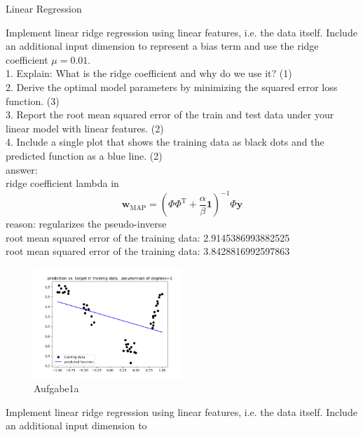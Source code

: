 \documentclass[
	ngerman,
     solution=true
	]{tudaexercise}
\begin{document}
\begin{task}{Linear Regression}
\begin{subtask}[1a)]
Implement linear ridge regression using linear features, i.e. the data itself. Include an additional input dimension to
represent a bias term and use the ridge coefficient $ \mu = 0.01$.\\[15pt]
1. Explain: What is the ridge coefficient and why do we use it? (1)\\[15pt]
2. Derive the optimal model parameters by minimizing the squared error loss function. (3)\\[15pt]
3. Report the root mean squared error of the train and test data under your linear model with linear features. (2)\\[15pt]
4. Include a single plot that shows the training data as black dots and the predicted function as a blue line. (2)
\\[15pt]
answer:\\[15pt]
ridge coefficient lambda in
\[
\mathbf{w}_{\mathrm{MAP}}=\left(\Phi \Phi^{\mathrm{T}}+\frac{\alpha}{\beta} \mathbf{1}\right)^{-1} \Phi \mathbf{y}
\]
reason: regularizes the pseudo-inverse\\
root mean squared error of the training data: 2.9145386993882525\\
root mean squared error of the training data: 3.8428816992597863\\
\begin{figure}[H] 
\centering 
\includegraphics[width=0.5\textwidth]{Aufgabe_1a.png} 
\caption{Aufgabe1a } 
\label{Fig.main1}
\end{figure}
\end{subtask}
\begin{subtask}[1b)]
Implement linear ridge regression using linear features, i.e. the data itself. Include an additional input dimension to

\end{subtask}
\end{task}
\end{document}
